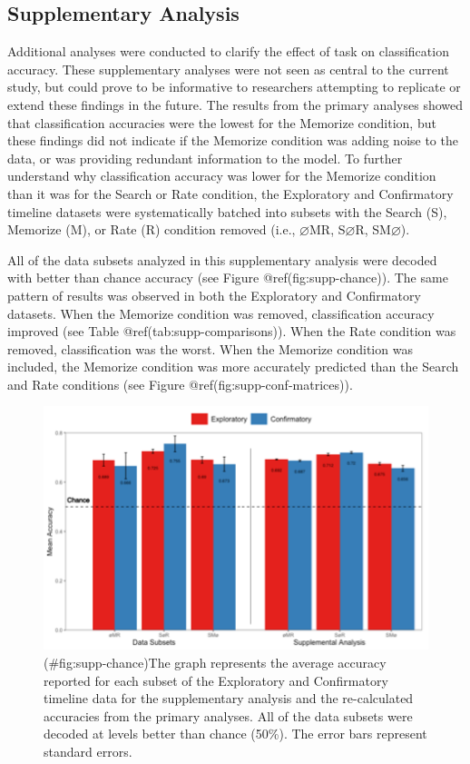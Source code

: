 \clearpage
\makeatletter
\efloat@restorefloats
\makeatother


\begin{appendix}
\hypertarget{supplementary-analysis}{%
\section{Supplementary Analysis}\label{supplementary-analysis}}

Additional analyses were conducted to clarify the effect of task on
classification accuracy. These supplementary analyses were not seen as
central to the current study, but could prove to be informative to
researchers attempting to replicate or extend these findings in the
future. The results from the primary analyses showed that classification
accuracies were the lowest for the Memorize condition, but these
findings did not indicate if the Memorize condition was adding noise to
the data, or was providing redundant information to the model. To
further understand why classification accuracy was lower for the
Memorize condition than it was for the Search or Rate condition, the
Exploratory and Confirmatory timeline datasets were systematically
batched into subsets with the Search (S), Memorize (M), or Rate (R)
condition removed (i.e., \(\varnothing\)MR, S\(\varnothing\)R,
SM\(\varnothing\)).

All of the data subsets analyzed in this supplementary analysis were
decoded with better than chance accuracy (see Figure
@ref(fig:supp-chance)). The same pattern of results was observed in both
the Exploratory and Confirmatory datasets. When the Memorize condition
was removed, classification accuracy improved (see Table
@ref(tab:supp-comparisons)). When the Rate condition was removed,
classification was the worst. When the Memorize condition was included,
the Memorize condition was more accurately predicted than the Search and
Rate conditions (see Figure @ref(fig:supp-conf-matrices)).

\begin{figure}
\centering
\includegraphics{supplementary_analysis/recalc_orig_accs/recalc_bar_graph.png}
\caption{(\#fig:supp-chance)The graph represents the average accuracy
reported for each subset of the Exploratory and Confirmatory timeline
data for the supplementary analysis and the re-calculated accuracies
from the primary analyses. All of the data subsets were decoded at
levels better than chance (50\%). The error bars represent standard
errors.}
\end{figure}


\end{appendix}

